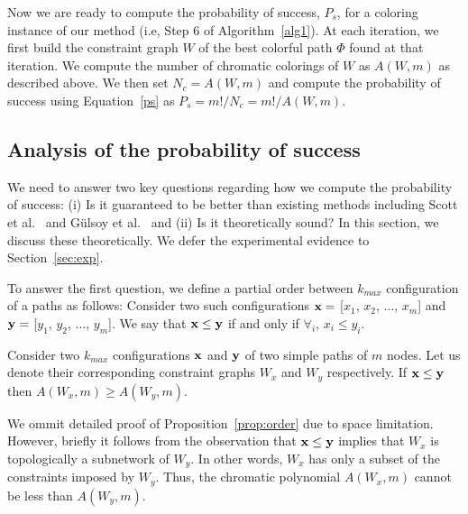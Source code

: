 \documentclass{ws-procs11x85}
\begin{document}
Now we are ready to compute the probability of success, $P_s$, for a
coloring instance of our method (i.e, Step 6 of Algorithm~\ref{alg1}).
At each iteration, we first build the constraint graph $W$ of the best
colorful path $\Phi$ found at that iteration. We compute the number of
chromatic colorings of $W$ as $A(W, m)$ as described above.  We then
set $N_c = A(W, m)$ and compute the probability of success using
Equation~\ref{ps} as $P_s = m!/N_c = m!/A(W, m)$.


\subsection{Analysis of the probability of success}

We need to answer two key questions regarding how we compute the
probability of success: (i) Is it guaranteed to be better than
existing methods including Scott et al.~\cite{scott} and G{\"u}lsoy et
al.~\cite{gulsoy} and (ii) Is it theoretically sound? In this section,
we discuss these theoretically. We defer the experimental evidence to
Section~\ref{sec:exp}.

To answer the first question, we define a partial order between
$k_{max}$ configuration of a paths as follows: Consider two such
configurations ${\bf x} =$ [$x_1$, $x_2$, $\ldots$, $x_m$] and ${\bf
  y} =$ [$y_1$, $y_2$, $\ldots$, $y_m$]. We say that ${\bf x} \leq
{\bf y}$ if and only if $\forall_i$, $x_i \leq y_i$.

\begin{proposition}
  Consider two $k_{max}$ configurations ${\bf x}$ and ${\bf y}$ of two
  simple paths of $m$ nodes. Let us denote their corresponding
  constraint graphs $W_x$ and $W_y$ respectively.  If ${\bf x} \leq
  {\bf y}$ then $A(W_x, m) \geq A(W_y, m)$.

\label{prop:order}
\end{proposition}

We ommit detailed proof of Proposition~\ref{prop:order} due to space
limitation. However, briefly it follows from the observation that
${\bf x} \leq {\bf y}$ implies that $W_x$ is topologically a
subnetwork of $W_y$. In other words, $W_x$ has only a subset of the
constraints imposed by $W_y$. Thus, the chromatic polynomial 
$A(W_x, m)$ cannot be less than $A(W_y, m)$.
\end{document}
